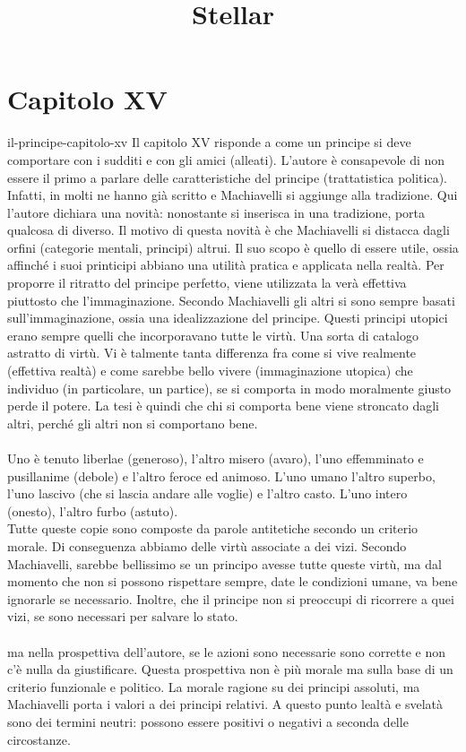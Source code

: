 \documentclass[preview]{standalone}
\begin{document}
\title{Stellar}
\genpage

\section{Capitolo XV}

\begin{snippet}{il-principe-capitolo-xv}
    Il capitolo XV risponde a come un principe si deve comportare
    con i sudditi e con gli amici (alleati).
    L'autore è consapevole di non essere il primo a parlare
    delle caratteristiche del principe (trattatistica politica).
    Infatti, in molti ne hanno già scritto e Machiavelli si
    aggiunge alla tradizione.
    Qui l'autore dichiara una novità: nonostante si inserisca in una tradizione,
    porta qualcosa di diverso.
    Il motivo di questa novità è che Machiavelli si distacca
    dagli orfini (categorie mentali, principi) altrui.
    Il suo scopo è quello di essere utile, ossia
    affinché i suoi printicipi abbiano una utilità pratica e applicata
    nella realtà.
    Per proporre il ritratto del principe perfetto, viene utilizzata
    la verà effettiva piuttosto che l'immaginazione.
    Secondo Machiavelli gli altri si sono sempre basati sull'immaginazione,
    ossia una idealizzazione del principe.
    Questi principi utopici erano sempre quelli che incorporavano tutte le virtù.
    Una sorta di catalogo astratto di virtù.
    Vi è talmente tanta differenza fra come si vive realmente (effettiva realtà)
    e come sarebbe bello vivere (immaginazione utopica) che
    individuo (in particolare, un partice), se si comporta in modo moralmente giusto
    perde il potere. La tesi è quindi che chi si comporta bene
    viene stroncato dagli altri, perché gli altri non si comportano bene.
    \\\\
    Uno è tenuto liberlae (generoso), l'altro misero (avaro),
    l'uno effemminato e pusillanime (debole) e l'altro
    feroce ed animoso. L'uno umano l'altro superbo, l'uno lascivo (che si lascia andare alle voglie) e l'altro casto.
    L'uno intero (onesto), l'altro furbo (astuto).
    \\
    Tutte queste copie sono composte da parole antitetiche
    secondo un criterio morale. Di conseguenza abbiamo delle virtù associate a dei vizi.
    Secondo Machiavelli, sarebbe bellissimo se un principo avesse tutte queste virtù,
    ma dal momento che non si possono rispettare sempre, date le condizioni umane,
    va bene ignorarle se necessario.
    Inoltre, che il principe non si preoccupi di ricorrere a quei vizi,
    se sono necessari per salvare lo stato.
    \\\\
    ma nella prospettiva dell'autore, se le azioni sono necessarie
    sono corrette e non c'è nulla da giustificare.
    Questa prospettiva non è più morale ma sulla base di un criterio funzionale
    e politico.
    La morale ragione su dei principi assoluti, ma Machiavelli porta i valori a
    dei principi relativi.
    A questo punto lealtà e svelatà sono dei termini neutri:
    possono essere positivi o negativi a seconda delle circostanze.
\end{snippet}
\end{document}
